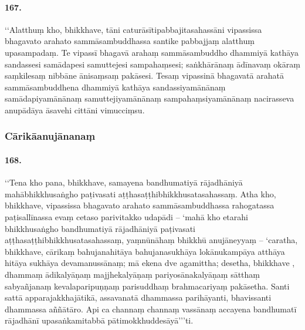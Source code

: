 \paragraph{167.} ‘‘Alatthuṃ kho, bhikkhave, tāni caturāsītipabbajitasahassāni vipassissa bhagavato arahato sammāsambuddhassa santike pabbajjaṃ alatthuṃ upasampadaṃ. Te vipassī bhagavā arahaṃ sammāsambuddho dhammiyā kathāya sandassesi samādapesi samuttejesi sampahaṃsesi; saṅkhārānaṃ ādīnavaṃ okāraṃ saṃkilesaṃ nibbāne ānisaṃsaṃ pakāsesi. Tesaṃ vipassinā bhagavatā arahatā sammāsambuddhena dhammiyā kathāya sandassiyamānānaṃ samādapiyamānānaṃ samuttejiyamānānaṃ sampahaṃsiyamānānaṃ nacirasseva anupādāya āsavehi cittāni vimucciṃsu.

\subsubsection{Cārikāanujānanaṃ}

\paragraph{168.} ‘‘Tena kho pana, bhikkhave, samayena bandhumatiyā rājadhāniyā mahābhikkhusaṅgho paṭivasati aṭṭhasaṭṭhibhikkhusatasahassaṃ. Atha kho, bhikkhave, vipassissa bhagavato arahato sammāsambuddhassa rahogatassa paṭisallīnassa evaṃ cetaso parivitakko udapādi – ‘mahā kho etarahi bhikkhusaṅgho bandhumatiyā rājadhāniyā paṭivasati aṭṭhasaṭṭhibhikkhusatasahassaṃ, yaṃnūnāhaṃ bhikkhū anujāneyyaṃ – ‘caratha, bhikkhave, cārikaṃ bahujanahitāya bahujanasukhāya lokānukampāya atthāya hitāya sukhāya devamanussānaṃ; mā ekena dve agamittha; desetha, bhikkhave , dhammaṃ ādikalyāṇaṃ majjhekalyāṇaṃ pariyosānakalyāṇaṃ sātthaṃ sabyañjanaṃ kevalaparipuṇṇaṃ parisuddhaṃ brahmacariyaṃ pakāsetha. Santi sattā apparajakkhajātikā, assavanatā dhammassa parihāyanti, bhavissanti dhammassa aññātāro. Api ca channaṃ channaṃ vassānaṃ accayena bandhumatī rājadhānī upasaṅkamitabbā pātimokkhuddesāyā’’’ti.

